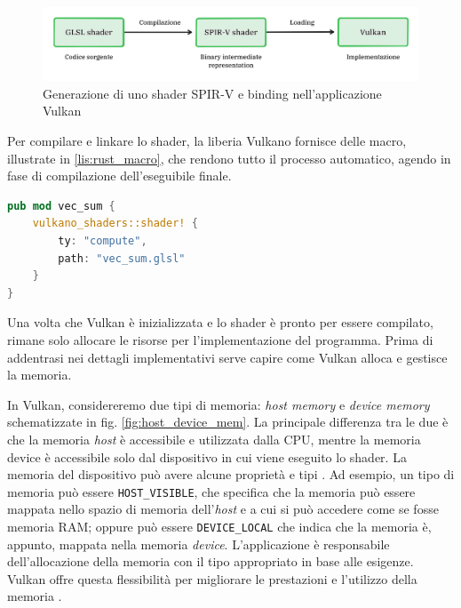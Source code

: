 \begin{figure}[ht]
    \centering
    \includegraphics[width=.9\linewidth]{images/chapter2/shader.png}
    \caption{Generazione di uno shader SPIR-V e binding nell'applicazione Vulkan}
    \label{fig:shader}
\end{figure}

Per compilare e linkare lo shader, la liberia Vulkano fornisce delle macro, illustrate in \ref{lis:rust_macro}, che rendono tutto il processo automatico, agendo in fase di compilazione dell'eseguibile finale.

\vspace{5mm}
\begin{lstlisting}[language=Rust, caption=Compilazione e binding dello shader GLSL, label=lis:rust_macro]
pub mod vec_sum {
    vulkano_shaders::shader! {
        ty: "compute",
        path: "vec_sum.glsl"
    }
}
\end{lstlisting}
\vspace{5mm}

Una volta che Vulkan è inizializzata e lo shader è pronto per essere compilato, rimane solo allocare le risorse per l'implementazione del programma. Prima di addentrasi nei dettagli implementativi serve capire come Vulkan alloca e gestisce la memoria.

In Vulkan, considereremo due tipi di memoria: \textit{host memory} e \textit{device memory} schematizzate in fig. \ref{fig:host_device_mem}. La principale differenza tra le due è che la memoria \textit{host} è accessibile e utilizzata dalla \gls{CPU}, mentre la memoria device è accessibile solo dal dispositivo in cui viene eseguito lo shader. La memoria del dispositivo può avere alcune proprietà e tipi \cite[]{KG:VulkanGuide}. Ad esempio, un tipo di memoria può essere \verb|HOST_VISIBLE|, che specifica che la memoria può essere mappata nello spazio di memoria dell'\textit{host} e a cui si può accedere come se fosse memoria RAM; oppure può essere \verb|DEVICE_LOCAL| che indica che la memoria è, appunto, mappata nella memoria \textit{device}. L'applicazione è responsabile dell'allocazione della memoria con il tipo appropriato in base alle esigenze. Vulkan offre questa flessibilità per migliorare le prestazioni e l'utilizzo della memoria \cite[]{KG:MemoryFlag}.

